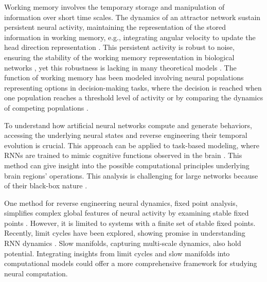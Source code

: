 \documentclass[12pt,letterpaper, onecolumn]{article}
\theoremstyle{definition}
\theoremstyle{remark}
\begin{document}
Working memory involves the temporary storage and manipulation of information over short time scales. The dynamics of an attractor network sustain persistent neural activity, maintaining the representation of the stored information in working memory, e.g., integrating angular velocity to update the head direction representation \citep{barak2013, barak2014, durstewitz2000, wolpert1995, goncalves2014, burak2009, goldman2007, aksay2007, noorman2022, cueva2021a, cueva2021b}. This persistent activity is robust to noise, ensuring the stability of the working memory representation \citep{koulakov2002} in biological networks \citep{gallego2020}, yet this robustness is lacking in many theoretical models \citep{renart2003, seeholzer2019, machens2008}.
The function of working memory has been modeled involving neural populations representing options in decision-making tasks, where the decision is reached when one population reaches a threshold level of activity or by comparing the dynamics of competing populations \citep{wong2007, wong2008, hocker2024, esnaola2022flexible}.

To understand how artificial neural networks compute and generate behaviors, accessing the underlying neural states and reverse engineering their temporal evolution is crucial. This approach can be applied to task-based modeling, where RNNs are trained to mimic cognitive functions observed in the brain \citep{darshan2022, barak2017recurrent, durstewitz2023reconstructing, yang2019task, yang2019multiple, yang2020artificial, jarne2023b, song2016}. This method can give insight into the possible computational principles underlying brain regions' operations. This analysis is challenging for large networks because of their black-box nature \citep{lipton2018, erasmus2021}.


One method for reverse engineering neural dynamics, fixed point analysis, simplifies complex global features of neural activity by examining stable fixed points \citep{sussillo2013blackbox, sussillo2014, beer2018, maheswaranathan2019universality, driscoll2022, mante2013context}. However, it is limited to systems with a finite set of stable fixed points. Recently, limit cycles have been explored, showing promise in understanding RNN dynamics \citep{pals2024}. Slow manifolds, capturing multi-scale dynamics, also hold potential. Integrating insights from limit cycles and slow manifolds into computational models could offer a more comprehensive framework for studying neural computation.
\end{document}
